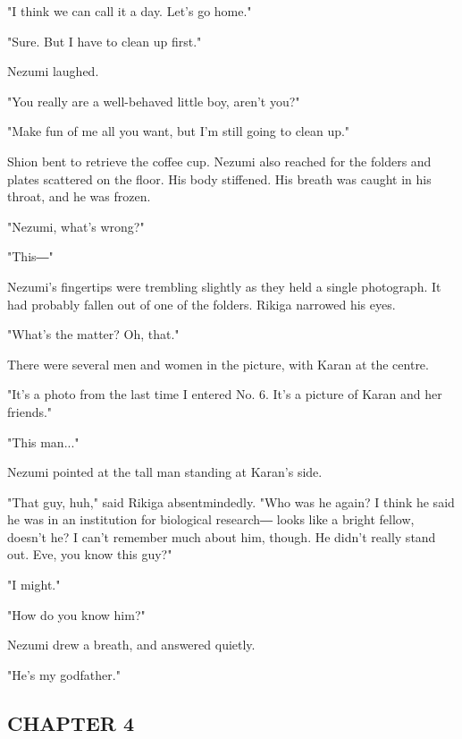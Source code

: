 "I think we can call it a day. Let's go home."

"Sure. But I have to clean up first."

Nezumi laughed.

"You really are a well-behaved little boy, aren't you?"

"Make fun of me all you want, but I'm still going to clean up."

Shion bent to retrieve the coffee cup. Nezumi also reached for the
folders and plates scattered on the floor. His body stiffened. His
breath was caught in his throat, and he was frozen.

"Nezumi, what's wrong?"

"This―"

Nezumi's fingertips were trembling slightly as they held a single
photograph. It had probably fallen out of one of the folders. Rikiga
narrowed his eyes.

"What's the matter? Oh, that."

There were several men and women in the picture, with Karan at the
centre.

"It's a photo from the last time I entered No. 6. It's a picture of
Karan and her friends."

"This man..."

Nezumi pointed at the tall man standing at Karan's side.

"That guy, huh," said Rikiga absentmindedly. "Who was he again? I think
he said he was in an institution for biological research― looks like a
bright fellow, doesn't he? I can't remember much about him, though. He
didn't really stand out. Eve, you know this guy?"

"I might."

"How do you know him?"

Nezumi drew a breath, and answered quietly.

"He's my godfather."

\hypertarget{index_split_046.htmlux5cux23calibre_pb_91}{}

\protect\hypertarget{index_split_089.html}{}{}

\hypertarget{index_split_089.htmlux5cux23calibre_pb_0}{}

\hypertarget{index_split_089.htmlux5cux23calibre_toc_5}{%
\subsection{CHAPTER 4}\label{index_split_089.htmlux5cux23calibre_toc_5}}

